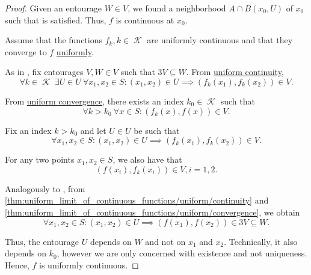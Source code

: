 \begin{proof}
  Given an entourage \( W \in V \), we found a neighborhood \( A \cap B(x_0, U) \) of \( x_0 \) such that  is satisfied. Thus, \( f \) is continuous at \( x_0 \).

   Assume that the functions \( f_k, k \in \mscrK \) are uniformly continuous and that they converge to \( f \) \hyperref[def:function_net_convergence/locally_uniform]{uniformly}.

  As in , fix entourages \( V, W \in V \) such that \( 3V \subseteq W \). From \hyperref[def:uniform_continuity]{uniform continuity},
  \begin{equation*}
    \forall k \in \mscrK \ \exists U \in U \ \forall x_1, x_2 \in S : (x_1, x_2) \in U \implies (f_k(x_1), f_k(x_2)) \in V.
  \end{equation*}

  From \hyperref[def:function_net_convergence]{uniform convergence}, there exists an index \( k_0 \in \mscrK \) such that
  \begin{equation*}
    \forall k > k_0 \ \forall x \in S : (f_k(x), f(x)) \in V.
  \end{equation*}

  Fix an index \( k > k_0 \) and let \( U \in U \) be such that
  \begin{equation}\label{thm:uniform_limit_of_continuous_functions/uniform/continuity}
    \forall x_1, x_2 \in S : (x_1, x_2) \in U \implies (f_k(x_1), f_k(x_2)) \in V.
  \end{equation}

  For any two points \( x_1, x_2 \in S \), we also have that
  \begin{equation}\label{thm:uniform_limit_of_continuous_functions/uniform/convergence}
    (f(x_i), f_k(x_i)) \in V, i = 1, 2.
  \end{equation}

  Analogously to , from \eqref{thm:uniform_limit_of_continuous_functions/uniform/continuity} and \eqref{thm:uniform_limit_of_continuous_functions/uniform/convergence}, we obtain
  \begin{equation*}
    \forall x_1, x_2 \in S : (x_1, x_2) \in U \implies (f(x_1), f(x_2)) \in 3V \subseteq W.
  \end{equation*}

  Thus, the entourage \( U \) depends on \( W \) and not on \( x_1 \) and \( x_2 \). Technically, it also depends on \( k_0 \), however we are only concerned with existence and not uniqueness. Hence, \( f \) is uniformly continuous.
\end{proof}

